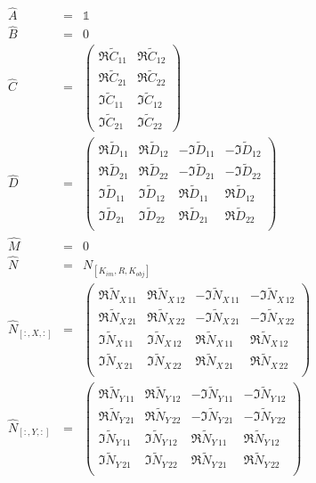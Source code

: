 \documentclass[12pt,a4paper,twoside,openright,BCOR10mm,headsepline,titlepage,abstracton,chapterprefix,final]{scrreprt}
\newcommand\unittensor{\mathds{1}}
\begin{document}
\begin{eqnarray}
 \hat{A} &=& \unittensor \\
 \hat{B} &=& 0 \\
 \hat{C} &=&
   \begin{pmatrix}
    \Re \tilde{C}_{11} & \Re \tilde{C}_{12} \\
    \Re \tilde{C}_{21} & \Re \tilde{C}_{22} \\
    \Im \tilde{C}_{11} & \Im \tilde{C}_{12} \\
    \Im \tilde{C}_{21} & \Im \tilde{C}_{22}
   \end{pmatrix}
 \\
 \hat{D} &=&
   \begin{pmatrix}
     \Re \tilde{D}_{11} & \Re \tilde{D}_{12} & - \Im \tilde{D}_{11} & - \Im \tilde{D}_{12} \\
     \Re \tilde{D}_{21} & \Re \tilde{D}_{22} & - \Im \tilde{D}_{21} & - \Im \tilde{D}_{22} \\
     \Im \tilde{D}_{11} & \Im \tilde{D}_{12} &   \Re \tilde{D}_{11} &   \Re \tilde{D}_{12} \\
     \Im \tilde{D}_{21} & \Im \tilde{D}_{22} &   \Re \tilde{D}_{21} &   \Re \tilde{D}_{22} \\
   \end{pmatrix}
 \\
 \hat{M} &=& 0 \\
 \hat{N} &=& N_{[K_{im}, R, K_{obj}]} \\
 \hat{N}_{[:,X,:]} &=&
   \begin{pmatrix}
     \Re \tilde{N}_{X\,11} & \Re \tilde{N}_{X\,12} & - \Im \tilde{N}_{X\,11} & - \Im \tilde{N}_{X\,12} \\
     \Re \tilde{N}_{X\,21} & \Re \tilde{N}_{X\,22} & - \Im \tilde{N}_{X\,21} & - \Im \tilde{N}_{X\,22} \\
     \Im \tilde{N}_{X\,11} & \Im \tilde{N}_{X\,12} &   \Re \tilde{N}_{X\,11} &   \Re \tilde{N}_{X\,12} \\
     \Im \tilde{N}_{X\,21} & \Im \tilde{N}_{X\,22} &   \Re \tilde{N}_{X\,21} &   \Re \tilde{N}_{X\,22} \\
   \end{pmatrix}
 \\
  \hat{N}_{[:,Y,:]} &=&
   \begin{pmatrix}
     \Re \tilde{N}_{Y\,11} & \Re \tilde{N}_{Y\,12} & - \Im \tilde{N}_{Y\,11} & - \Im \tilde{N}_{Y\,12} \\
     \Re \tilde{N}_{Y\,21} & \Re \tilde{N}_{Y\,22} & - \Im \tilde{N}_{Y\,21} & - \Im \tilde{N}_{Y\,22} \\
     \Im \tilde{N}_{Y\,11} & \Im \tilde{N}_{Y\,12} &   \Re \tilde{N}_{Y\,11} &   \Re \tilde{N}_{Y\,12} \\
     \Im \tilde{N}_{Y\,21} & \Im \tilde{N}_{Y\,22} &   \Re \tilde{N}_{Y\,21} &   \Re \tilde{N}_{Y\,22} \\
   \end{pmatrix}
\end{eqnarray}
\end{document}
